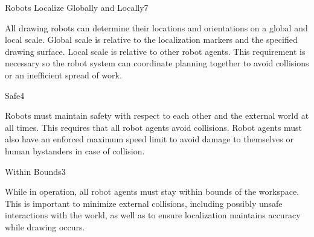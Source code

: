 \begin{functional_requirement}{Robots Localize Globally and Locally}{7}
\item All drawing robots can determine their locations and orientations on a global and local scale. Global scale is relative to the localization markers and the specified drawing surface. Local scale is relative to other robot agents. This requirement is necessary so the robot system can coordinate planning together to avoid collisions or an inefficient spread of work. 
\end{functional_requirement}

\begin{functional_requirement}{Safe}{4}
\item Robots must maintain safety with respect to each other and the external world at all times. This requires that all robot agents avoid collisions. Robot agents must also have an enforced maximum speed limit to avoid damage to themselves or human bystanders in case of collision. 
\end{functional_requirement}

\begin{functional_requirement}{Within Bounds}{3}
\item While in operation, all robot agents must stay within bounds of the workspace. This is important to minimize external collisions, including possibly unsafe interactions with the world, as well as to ensure localization maintains accuracy while drawing occurs.
\end{functional_requirement}


